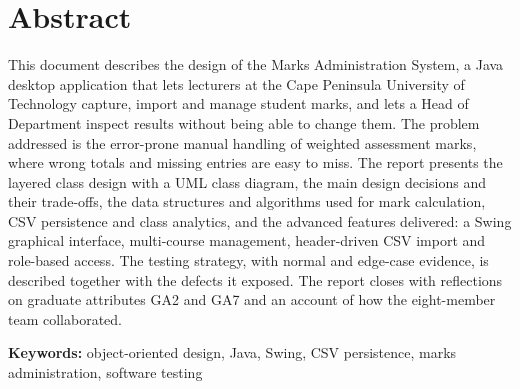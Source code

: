 \section*{Abstract}

This document describes the design of the Marks Administration System, a Java desktop application that lets lecturers at the Cape Peninsula University of Technology capture, import and manage student marks, and lets a Head of Department inspect results without being able to change them. The problem addressed is the error-prone manual handling of weighted assessment marks, where wrong totals and missing entries are easy to miss. The report presents the layered class design with a UML class diagram, the main design decisions and their trade-offs, the data structures and algorithms used for mark calculation, CSV persistence and class analytics, and the advanced features delivered: a Swing graphical interface, multi-course management, header-driven CSV import and role-based access. The testing strategy, with normal and edge-case evidence, is described together with the defects it exposed. The report closes with reflections on graduate attributes GA2 and GA7 and an account of how the eight-member team collaborated.

\vspace{4mm}
\textbf{Keywords:} object-oriented design, Java, Swing, CSV persistence, marks administration, software testing
